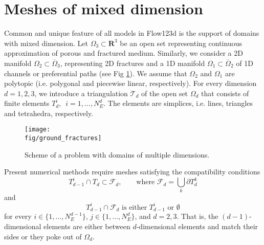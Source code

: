 \documentclass[12pt,a4paper]{report}
\def\Real{{\mathbf R}}
\def\fig{figures}
\begin{document}
\section{Meshes of mixed dimension}
Common and unique feature of all models in Flow123d is the support of
domains with mixed dimension. 
Let $\Omega_{3} \subset \Real^3$ be an open set representing continuous approximation of porous and fractured medium.
Similarly, we consider a 2D manifold $\Omega_2\subset\overline\Omega_3$, representing 2D fractures and a 1D manifold $\Omega_1\subset \overline\Omega_2$ of 1D channels or preferential paths (see Fig \ref{fig:multi-dim}).
We assume that $\Omega_2$ and $\Omega_1$ are polytopic (i.e. polygonal and piecewise linear, respectively).
For every dimension $d=1,2,3$, we introduce a triangulation $\mathcal{T}_{d}$ of the open set $\Omega_d$
that consists of finite elements $T_{d}^{i},$\ $i = 1,\dots,N_{E}^{d}$.
The elements are simplices, i.e. lines, triangles and tetrahedra, respectively.

\begin{figure}[h]
\centering
\texttt{[image: \\fig/ground\_fractures]}
\caption{
    \label{fig:multi-dim}
    Scheme of a problem with domains of multiple dimensions.
}
\end{figure}

Present numerical methods require meshes satisfying the compatibility conditions
\begin{equation}
        T_{d-1}^i \cap T_d \subset \mathcal{F}_d,   \qquad \text{where } \mathcal{F}_d = \bigcup_{k} \partial T_{d}^{k}
\end{equation}
and
\begin{equation}
        T_{d-1}^i \cap \mathcal{F}_d    \text{ is either $T_{d-1}^i$ or $\emptyset$}    
\end{equation}
for every $i\in\{1,\dots, N_{E}^{d-1}\}$, $j\in\{1,\dots,N_{E}^{d}\}$,  and $d=2,3$. That is, the $(d-1)$-dimensional elements are either between $d$-dimensional elements and
match their sides or they poke out of $\Omega_d$. 
\end{document}
